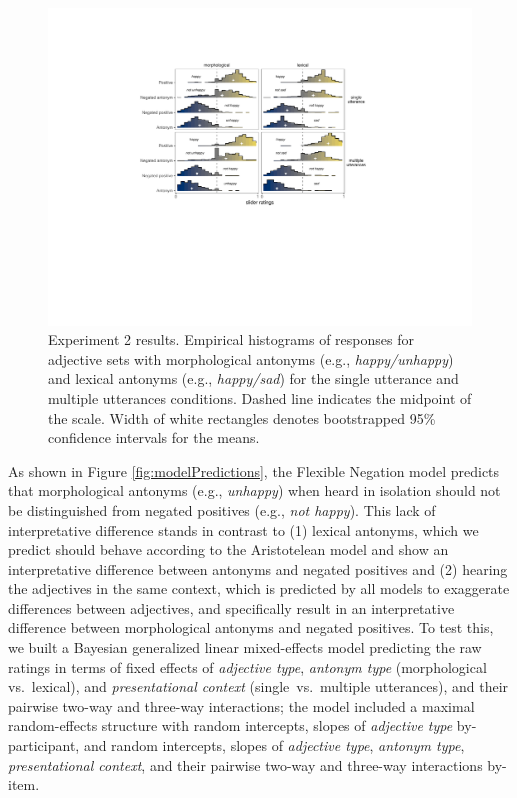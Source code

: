 \documentclass[floatsintext,doc]{apa6}
\begin{document}
\begin{figure}[t]
\centering \includegraphics[width=0.95\linewidth]{figs/expt2_directlabel_hist} 
\caption{Experiment 2 results. Empirical histograms of responses for adjective sets with morphological antonyms (e.g., \emph{happy/unhappy}) and lexical antonyms (e.g., \emph{happy/sad}) for the single utterance and multiple utterances conditions. Dashed line indicates the midpoint of the scale. Width of white rectangles denotes bootstrapped 95\% confidence intervals for the means.}
\label{fig:expt2-results}
\end{figure}

As shown in Figure \ref{fig:modelPredictions}, the Flexible Negation model predicts that morphological antonyms (e.g., \emph{unhappy}) when heard in isolation should not be distinguished from negated positives (e.g., \emph{not happy}). This lack of interpretative difference stands in contrast to (1) lexical antonyms, which we predict should behave according to the Aristotelean model and show an interpretative difference between antonyms and negated positives and (2) hearing the adjectives in the same context, which is predicted by all models to exaggerate differences between adjectives, and specifically result in an interpretative difference between morphological antonyms and negated positives.
To test this, we built a Bayesian generalized linear mixed-effects model predicting the raw ratings in terms of fixed effects of \emph{adjective type}, \emph{antonym type} (morphological vs.~lexical),  and \emph{presentational context} (single~vs.~multiple utterances), and their pairwise two-way and three-way interactions; the model included a maximal random-effects structure with random intercepts, slopes of \emph{adjective type} by-participant, and random intercepts, slopes of \emph{adjective type}, \emph{antonym type}, \emph{presentational context}, and their pairwise two-way and three-way interactions by-item.
\end{document}
